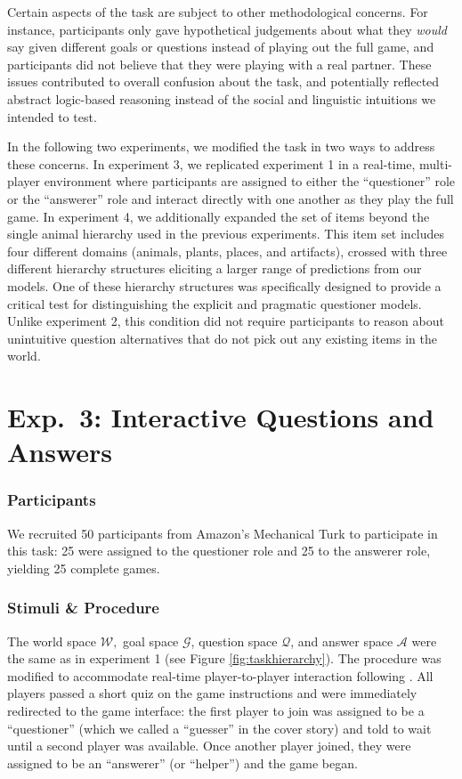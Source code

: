 \documentclass[12pt, floatsintext, man]{apa6}
\begin{document}
Certain aspects of the task are subject to other methodological concerns. For instance, participants only gave hypothetical judgements about what they \emph{would} say given different goals or questions instead of playing out the full game, and participants did not believe that they were playing with a real partner. These issues contributed to overall confusion about the task, and potentially reflected abstract logic-based reasoning instead of the social and linguistic intuitions we intended to test.

In the following two experiments, we modified the task in two ways to address these concerns. In experiment 3, we replicated experiment 1 in a real-time, multi-player environment where participants are assigned to either the ``questioner'' role or the ``answerer'' role and interact directly with one another as they play the full game. In experiment 4, we additionally expanded the set of items beyond the single animal hierarchy used in the previous experiments. This item set includes four different domains (animals, plants, places, and artifacts), crossed with three different hierarchy structures eliciting a larger range of predictions from our models. One of these hierarchy structures was specifically designed to provide a critical test for distinguishing the explicit and pragmatic questioner models. Unlike experiment 2, this condition did not require participants to reason about unintuitive question alternatives that do not pick out any existing items in the world. 

\section{Exp.~3: Interactive Questions and Answers}

\subsubsection{Participants} We recruited 50 participants
from Amazon's Mechanical Turk to participate in this task: 25 were assigned to the  questioner role and 25 to the answerer role, yielding 25 complete games.

\subsubsection{Stimuli \& Procedure} The world space $\mathcal{W},$ goal space $\mathcal{G}$, question space $\mathcal{Q}$, and answer space $\mathcal{A}$ were the same as in experiment 1 (see Figure \ref{fig:taskhierarchy}). The procedure was modified to accommodate real-time player-to-player interaction following . All players passed a short quiz on the game instructions and were immediately redirected to the game interface: the first player to join was assigned to be a ``questioner'' (which we called a ``guesser'' in the cover story) and told to wait until a second player was available. Once another player joined, they were assigned to be an ``answerer'' (or ``helper'') and the game began. 
\end{document}
